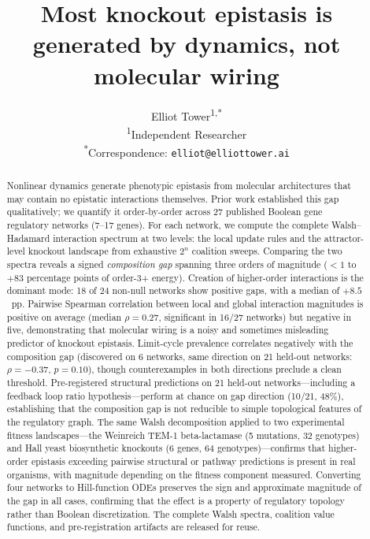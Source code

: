 \documentclass[10pt]{article}
\title{Most knockout epistasis is generated by dynamics, not molecular wiring}
\author{
  Elliot Tower\textsuperscript{1,*} \\[4pt]
  \small\textsuperscript{1}Independent Researcher \\
  \small\textsuperscript{*}Correspondence: \texttt{elliot@elliottower.ai}
}
\begin{document}
\maketitle
\linenumbers
\doublespacing

\begin{abstract}
Nonlinear dynamics generate phenotypic epistasis from molecular
architectures that may contain no epistatic interactions themselves.
Prior work established this gap qualitatively; we quantify it
order-by-order across 27 published Boolean gene regulatory networks
(7--17 genes). For each network, we compute the complete
Walsh--Hadamard interaction spectrum at two levels: the local update
rules and the attractor-level knockout landscape from exhaustive
$2^n$ coalition sweeps. Comparing the two spectra reveals a signed
\emph{composition gap} spanning three orders of magnitude ($< 1$ to
$+83$ percentage points of order-3+ energy). Creation of higher-order
interactions is the dominant mode: 18 of 24 non-null networks show
positive gaps, with a median of $+8.5$~pp. Pairwise Spearman
correlation between local and global interaction magnitudes is positive
on average (median $\rho = 0.27$, significant in 16/27 networks) but
negative in five, demonstrating that molecular wiring is a noisy and
sometimes misleading predictor of knockout epistasis. Limit-cycle prevalence correlates negatively with the composition gap
(discovered on 6 networks, same direction on 21 held-out networks:
$\rho = -0.37$, $p = 0.10$), though counterexamples in both
directions preclude a clean threshold. Pre-registered structural
predictions on 21 held-out networks---including a feedback loop ratio
hypothesis---perform at chance on gap direction (10/21, 48\%),
establishing that the composition gap is not reducible to simple
topological features of the regulatory graph. The same Walsh
decomposition applied to two experimental fitness landscapes---the
Weinreich TEM-1 beta-lactamase (5 mutations, 32 genotypes) and Hall
yeast biosynthetic knockouts (6 genes, 64 genotypes)---confirms that
higher-order epistasis exceeding pairwise structural or pathway
predictions is present in real organisms, with magnitude depending
on the fitness component measured. Converting four networks to
Hill-function ODEs preserves the sign and approximate magnitude of
the gap in all cases, confirming that the effect is a property of
regulatory topology rather than Boolean discretization. The complete Walsh spectra, coalition value functions, and
pre-registration artifacts are released for reuse.
\end{abstract}
\end{document}
